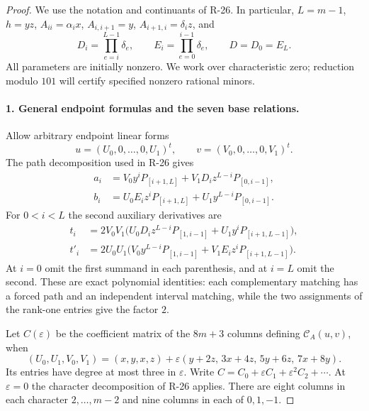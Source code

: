 \begin{proof}
We use the notation and continuants of R-26. In particular,
$L=m-1$, $h=yz$, $A_{ii}=\alpha_i x$, $A_{i,i+1}=y$,
$A_{i+1,i}=\delta_i z$, and
\[
 D_i=\prod_{e=i}^{L-1}\delta_e,\qquad
 E_i=\prod_{e=0}^{i-1}\delta_e,\qquad D=D_0=E_L.
\]
All parameters are initially nonzero. We work over
characteristic zero; reduction modulo $101$ will certify specified
nonzero rational minors.

\paragraph{1. General endpoint formulas and the seven base relations.}
Allow arbitrary endpoint linear forms
\[
 u=(U_0,0,\ldots,0,U_1)^t,\qquad
 v=(V_0,0,\ldots,0,V_1)^t.
\]
The path decomposition used in R-26 gives
\begin{align}
 a_i&=V_0y^iP_{[i+1,L]}+V_1D_i z^{L-i}P_{[0,i-1]},
                                                    \label{R27:a}\\
 b_i&=U_0E_i z^iP_{[i+1,L]}+U_1y^{L-i}P_{[0,i-1]}.
                                                    \label{R27:b}
\end{align}
For $0<i<L$ the second auxiliary derivatives are
\begin{align}
 t_i&=2V_0V_1\bigl(U_0D_i z^{L-i}P_{[1,i-1]}
                         +U_1y^iP_{[i+1,L-1]}\bigr),
                                                    \label{R27:t}\\
 t'_i&=2U_0U_1\bigl(V_0y^{L-i}P_{[1,i-1]}
                         +V_1E_i z^iP_{[i+1,L-1]}\bigr).
                                                    \label{R27:tp}
\end{align}
At $i=0$ omit the first summand in each parenthesis, and at
$i=L$ omit the second. These are exact polynomial identities:
each complementary matching has a forced path and an independent
interval matching, while the two assignments of the rank-one
entries give the factor $2$.

Let $C(\varepsilon)$ be the coefficient matrix of the $8m+3$
columns defining $\mathcal C_A(u,v)$, when
\begin{equation}\label{R27:endpoint_line}
 (U_0,U_1,V_0,V_1)
 =(x,y,x,z)+\varepsilon(y+2z,\,3x+4z,\,5y+6z,\,7x+8y).
\end{equation}
Its entries have degree at most three in $\varepsilon$. Write
$C=C_0+\varepsilon C_1+\varepsilon^2C_2+\cdots$.
At $\varepsilon=0$ the character decomposition of R-26 applies.
There are eight columns in each character $2,\ldots,m-2$ and
nine columns in each of $0,1,-1$.


\end{proof}
